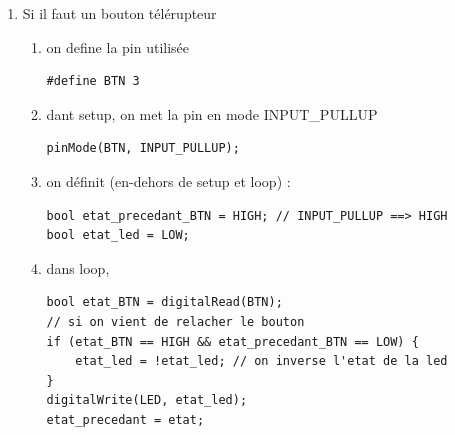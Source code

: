\documentclass[a4paper]{article}
\begin{document}
\begin{enumerate}
\begin{enumerate}
    \item Si il faut un bouton télérupteur
    \begin{enumerate}
        \item on define la pin utilisée
\begin{lstlisting}[frame=single]
#define BTN 3
\end{lstlisting}
        \item dant setup, on met la pin en mode INPUT\_PULLUP
\begin{lstlisting}[frame=single]
pinMode(BTN, INPUT_PULLUP);
\end{lstlisting}
\item on définit (en-dehors de setup et loop) :
\begin{lstlisting}[frame=single]
bool etat_precedant_BTN = HIGH; // INPUT_PULLUP ==> HIGH
bool etat_led = LOW;
\end{lstlisting}
        \item dans loop,
\begin{lstlisting}[frame=single]
bool etat_BTN = digitalRead(BTN);
// si on vient de relacher le bouton
if (etat_BTN == HIGH && etat_precedant_BTN == LOW) {
    etat_led = !etat_led; // on inverse l'etat de la led
}
digitalWrite(LED, etat_led);
etat_precedant = etat;
\end{lstlisting}
    \end{enumerate}

\end{enumerate}


\end{enumerate}




















\tableofcontents
\end{document}
